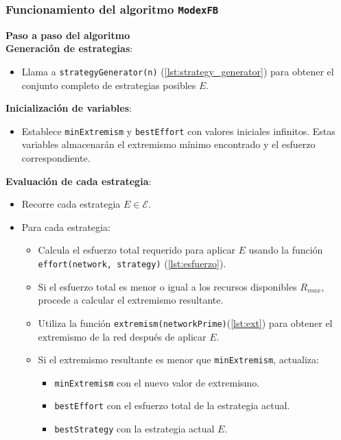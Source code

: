 \documentclass[letterpaper,10pt]{article}
\begin{document}
\subsubsection*{Funcionamiento del algoritmo \texttt{ModexFB}}

\textbf{Paso a paso del algoritmo}
\\

\textbf{Generación de estrategias}:
\begin{itemize}
    \item Llama a \texttt{strategyGenerator(n)} (\ref{lst:strategy_generator}) para obtener el conjunto completo de estrategias posibles $E$.
\end{itemize}

\textbf{Inicialización de variables}:
\begin{itemize}
    \item Establece \texttt{minExtremism} y \texttt{bestEffort} con valores iniciales infinitos. Estas variables almacenarán el extremismo mínimo encontrado y el esfuerzo correspondiente.
\end{itemize}

\textbf{Evaluación de cada estrategia}:
\begin{itemize}
    \item Recorre cada estrategia $E \in \mathcal{E}$.
    \item Para cada estrategia:
    \begin{itemize}
        \item Calcula el esfuerzo total requerido para aplicar $E$ usando la función \texttt{effort(network, strategy)} (\ref{lst:esfuerzo}).
        \item Si el esfuerzo total es menor o igual a los recursos disponibles $R_{max}$, procede a calcular el extremismo resultante.
        \item Utiliza la función \texttt{extremism(networkPrime)}(\ref{lst:ext}) para obtener el extremismo de la red después de aplicar $E$.
        \item Si el extremismo resultante es menor que \texttt{minExtremism}, actualiza:
        \begin{itemize}
            \item \texttt{minExtremism} con el nuevo valor de extremismo.
            \item \texttt{bestEffort} con el esfuerzo total de la estrategia actual.
            \item \texttt{bestStrategy} con la estrategia actual $E$.
        \end{itemize}
    \end{itemize}
\end{itemize}
\end{document}
